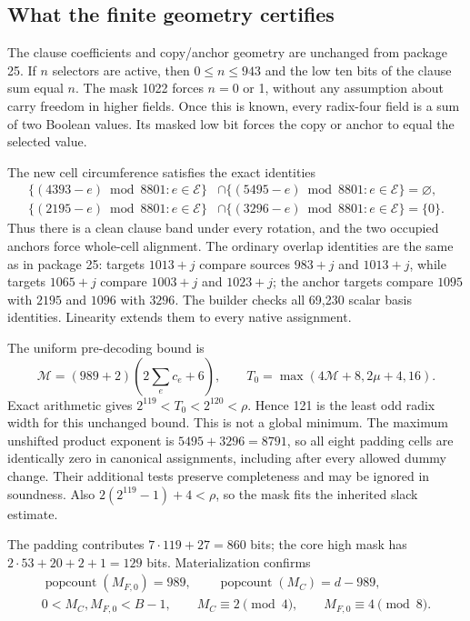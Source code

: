 \subsection{What the finite geometry certifies}

The clause coefficients and copy/anchor geometry are unchanged from
package 25.  If $n$ selectors are active, then $0\le n\le943$ and the low
ten bits of the clause sum equal $n$.  The mask 1022 forces $n=0$ or 1,
without any assumption about carry freedom in higher fields.  Once this
is known, every radix-four field is a sum of two Boolean values.  Its
masked low bit forces the copy or anchor to equal the selected value.

The new cell circumference satisfies the exact identities
\begin{align*}
 \{(4393-e)\bmod8801:e\in\mathcal E\}
 &\cap\{(5495-e)\bmod8801:e\in\mathcal E\}=\varnothing,\\
 \{(2195-e)\bmod8801:e\in\mathcal E\}
 &\cap\{(3296-e)\bmod8801:e\in\mathcal E\}=\{0\}.
\end{align*}
Thus there is a clean clause band under every rotation, and the two
occupied anchors force whole-cell alignment.  The ordinary overlap
identities are the same as in package 25: targets $1013+j$ compare
sources $983+j$ and $1013+j$, while targets $1065+j$ compare $1003+j$
and $1023+j$; the anchor targets compare $1095$ with $2195$ and $1096$
with $3296$.  The builder checks all 69,230 scalar basis identities.
Linearity extends them to every native assignment.

The uniform pre-decoding bound is
\[
 \mathcal M=(989+2)(2\sum_e c_e+6),\qquad
 T_0=\max(4\mathcal M+8,2\mu+4,16).
\]
Exact arithmetic gives $2^{119}<T_0<2^{120}<\rho$.  Hence 121 is the least
odd radix width for this unchanged bound.  This is not a global minimum.
The maximum unshifted product exponent is $5495+3296=8791$, so all eight
padding cells are identically zero in canonical assignments, including
after every allowed dummy change.  Their additional tests preserve
completeness and may be ignored in soundness.  Also
$2(2^{119}-1)+4<\rho$, so the mask fits the inherited slack estimate.

The padding contributes $7\cdot119+27=860$ bits; the core high mask has
$2\cdot53+20+2+1=129$ bits.  Materialization confirms
\begin{gather*}
 \operatorname{popcount}(M_{F,0})=989,\qquad
 \operatorname{popcount}(M_C)=d-989,\\
 0<M_C,M_{F,0}<B-1,\qquad
 M_C\equiv2\pmod4,\qquad M_{F,0}\equiv4\pmod8.
\end{gather*}


